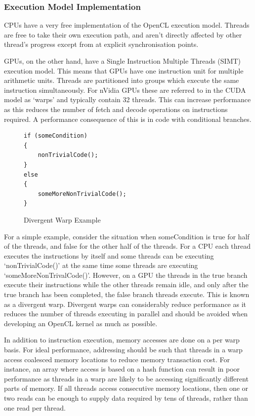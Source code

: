 \subsubsection{Execution Model Implementation}

CPUs have a very free implementation of the OpenCL execution model. Threads are
free to take their own execution path, and aren't directly affected by other
thread's progress except from at explicit synchronisation points.

GPUs, on the other hand, have a Single Instruction Multiple Threads (SIMT)
execution model. This means that GPUs have one instruction unit for multiple
arithmetic units. Threads are partitioned into groups which execute the same
instruction simultaneously. For nVidia GPUs these are referred to in the CUDA
model as `warps' and typically contain 32 threads. This can increase performance
as this reduces the number of fetch and decode operations on instructions
required. A performance consequence of this is in code with conditional
branches.

\begin{figure}[H]
\small\begin{verbatim}
if (someCondition)
{
    nonTrivialCode();
}
else
{
    someMoreNonTrivialCode();
}
\end{verbatim}
\caption{Divergent Warp Example}
\end{figure}

For a simple example, consider the situation when someCondition is true for half
of the threads, and false for the other half of the threads. For a CPU each
thread executes the instructions by itself and some threads can be executing
`nonTrivialCode()' at the same time some threads are executing
`someMoreNonTrivalCode()'. However, on a GPU the threads in the true branch
execute their instructions while the other threads remain idle, and only after
the true branch has been completed, the false branch threads execute. This is
known as a divergent warp. Divergent warps can considerably reduce performance
as it reduces the number of threads executing in parallel and should be avoided
when developing an OpenCL kernel as much as possible.

In addition to instruction execution, memory accesses are done on a per warp
basis. For ideal performance, addressing should be such that threads in a warp
access coalesced memory locations to reduce memory transaction cost. For
instance, an array where access is based on a hash function can result in poor
performance as threads in a warp are likely to be accessing significantly
different parts of memory. If all threads access consecutive memory locations,
then one or two reads can be enough to supply data required by tens of threads,
rather than one read per thread.

